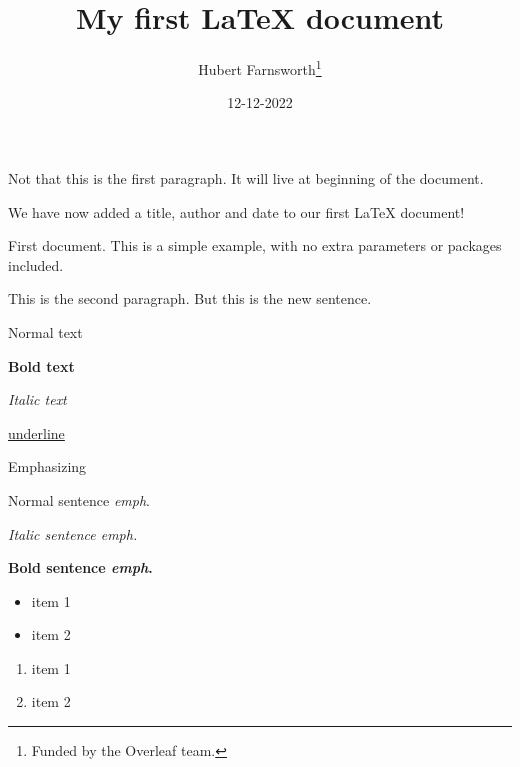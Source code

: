 \documentclass{article}
\title{My first LaTeX document}
\author{Hubert Farnsworth\thanks{Funded by the Overleaf team.}}
\date{12-12-2022}
\begin{document}
Not that this is the first paragraph.
It will live at beginning of the document.

\maketitle
We have now added a title, author and date to our first \LaTeX{} document!

\newpage
First document.
This is a simple example,
with no extra parameters or packages included.

This is the second paragraph.
But this is the new sentence.

\newpage
Normal text

\textbf{Bold text}

\textit{Italic text}

\underline{underline}

Emphasizing

Normal sentence \emph{emph}.

\textit{Italic sentence \emph{emph}.}

\textbf{Bold sentence \emph{emph}.}


\newpage
\begin{itemize}
    \item item 1
    \item item 2
\end{itemize}

\begin{enumerate}
    \item item 1
    \item item 2
\end{enumerate}
\end{document}
